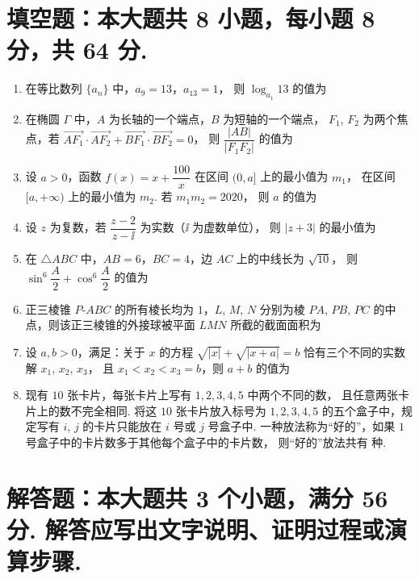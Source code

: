 \documentclass{chsmc}
\begin{document}
\section{填空题：本大题共 8 小题，每小题 8 分，共 64 分.}

\begin{enumerate}
  \item 在等比数列 $\{a_n\}$ 中，$a_9 = 13$，$a_{13} = 1$，
    则 $\log_{a_1} 13$ 的值为 \blankline
  \item 在椭圆 $\Gamma$ 中，$A$ 为长轴的一个端点，$B$ 为短轴的一个端点，
    $F_1$, $F_2$ 为两个焦点，若
    $\overrightarrow{AF_1}\cdot\overrightarrow{AF_2} + \overrightarrow{BF_1}\cdot\overrightarrow{BF_2} = 0$，
    则 $\dfrac{|AB|}{|F_1F_2|}$ 的值为 \blankline
  \item 设 $a > 0$，函数 $f(x) = x + \dfrac{100}{x}$ 在区间 $(0,a]$ 上的最小值为 $m_1$，
    在区间 $[a,+\infty)$ 上的最小值为 $m_2$. 若 $m_1 m_2 = 2020$，
    则 $a$ 的值为 \blankline
  \item 设 $z$ 为复数，若 $\dfrac{z-2}{z-\ii}$ 为实数（$\ii$ 为虚数单位），
    则 $|z+3|$ 的最小值为 \blankline
  \item 在 $\triangle ABC$ 中，$AB = 6$，$BC = 4$，边 $AC$ 上的中线长为 $\sqrt{10}$，
    则 $\sin^6\dfrac{A}{2} + \cos^6\dfrac{A}{2}$ 的值为 \blankline
  \item 正三棱锥 $P$-$ABC$ 的所有棱长均为 $1$，$L$, $M$, $N$ 分别为棱
    $PA$, $PB$, $PC$ 的中点，则该正三棱锥的外接球被平面 $LMN$ 所截的截面面积为 \blankline
  \item 设 $a, b > 0$，满足：关于 $x$ 的方程
    $\sqrt{|x|} + \sqrt{|x+a|} = b$ 恰有三个不同的实数解 $x_1$, $x_2$, $x_3$，
    且 $x_1 < x_2 < x_3 = b$，则 $a + b$ 的值为 \blankline
  \item 现有 $10$ 张卡片，每张卡片上写有 $1, 2, 3, 4, 5$ 中两个不同的数，
    且任意两张卡片上的数不完全相同. 将这 $10$ 张卡片放入标号为 $1, 2, 3, 4, 5$
    的五个盒子中，规定写有 $i$, $j$ 的卡片只能放在 $i$ 号或 $j$ 号盒子中.
    一种放法称为“好的”，如果 $1$ 号盒子中的卡片数多于其他每个盒子中的卡片数，
    则“好的”放法共有 \blankline 种.
\end{enumerate}

\section{解答题：本大题共 3 个小题，满分 56 分. 解答应写出文字说明、证明过程或演算步骤.}
\end{document}
